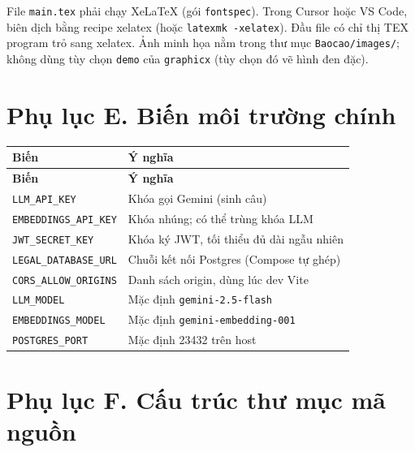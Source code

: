 File \texttt{main.tex} phải chạy XeLaTeX (gói \texttt{fontspec}). Trong Cursor
hoặc VS Code, biên dịch bằng recipe xelatex (hoặc \texttt{latexmk -xelatex}).
Đầu file có chỉ thị TEX program trỏ sang xelatex. Ảnh minh họa nằm trong thư mục
\texttt{Baocao/images/}; không dùng tùy chọn \texttt{demo} của \texttt{graphicx}
(tùy chọn đó vẽ hình đen đặc).

\section*{Phụ lục E. Biến môi trường chính}

\begin{longtable}{p{5.2cm}p{8.6cm}}
\toprule
\textbf{Biến} & \textbf{Ý nghĩa} \\
\midrule
\endfirsthead
\toprule
\textbf{Biến} & \textbf{Ý nghĩa} \\
\midrule
\endhead
\texttt{LLM\_API\_KEY} & Khóa gọi Gemini (sinh câu) \\
\texttt{EMBEDDINGS\_API\_KEY} & Khóa nhúng; có thể trùng khóa LLM \\
\texttt{JWT\_SECRET\_KEY} & Khóa ký JWT, tối thiểu đủ dài ngẫu nhiên \\
\texttt{LEGAL\_DATABASE\_URL} & Chuỗi kết nối Postgres (Compose tự ghép) \\
\texttt{CORS\_ALLOW\_ORIGINS} & Danh sách origin, dùng lúc dev Vite \\
\texttt{LLM\_MODEL} & Mặc định \texttt{gemini-2.5-flash} \\
\texttt{EMBEDDINGS\_MODEL} & Mặc định \texttt{gemini-embedding-001} \\
\texttt{POSTGRES\_PORT} & Mặc định 23432 trên host \\
\bottomrule
\end{longtable}

\section*{Phụ lục F. Cấu trúc thư mục mã nguồn}

